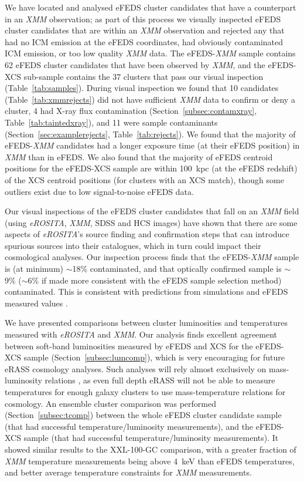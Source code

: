 \documentclass[fleqn,usenatbib]{mnras}
\begin{document}
We have located and analysed eFEDS cluster candidates that have a counterpart in an {\em XMM} observation; as part of this process we visually inspected eFEDS cluster candidates that are within an {\em XMM} observation and rejected any that had no ICM emission at the eFEDS coordinates, had obviously contaminated ICM emission, or too low quality {\em XMM} data. The eFEDS-{\em XMM} sample contains 62 eFEDS cluster candidates that have been observed by {\em XMM}, and the eFEDS-XCS sub-sample contains the 37 clusters that pass our visual inspection (Table~\ref{tab:samples}). During visual inspection we found that 10 candidates (Table~\ref{tab:xmmrejects}) did not have sufficient {\em XMM} data to confirm or deny a cluster, 4 had X-ray flux contamination (Section~\ref{subsec:contamxray}, Table~\ref{tab:taintedxray}), and 11 were sample contaminants (Section~\ref{sec:examplerejects}, Table~\ref{tab:rejects}). We found that the majority of eFEDS-{\em XMM} candidates had a longer exposure time (at their eFEDS position) in {\em XMM} than in eFEDS. We also found that the majority of eFEDS centroid positions for the eFEDS-XCS sample are within 100~kpc (at the eFEDS redshift) of the XCS centroid positions (for clusters with an XCS match), though some outliers exist due to low signal-to-noise eFEDS data.

Our visual inspections of the eFEDS cluster candidates that fall on an {\em XMM} field (using {\em eROSITA}, {\em XMM}, SDSS and HCS images) have shown that there are some aspects of {\em eROSITA}'s source finding and confirmation steps that can introduce spurious sources into their catalogues, which in turn could impact their cosmological analyses. Our inspection process finds that the eFEDS-{\em XMM} sample is (at minimum) ${\sim}$18\% contaminated, and that optically confirmed sample is ${\sim}$9\% (${\sim}$6\% if made more consistent with the eFEDS sample selection method) contaminated. This is consistent with predictions from simulations \citep[][]{simerass} and eFEDS measured values \citep[][]{efedsclusteropticalcat}.

We have presented comparisons between cluster luminosities and temperatures measured with {\em eROSITA} and {\em XMM}. Our analysis finds excellent agreement between soft-band luminosities measured by eFEDS and XCS for the eFEDS-XCS sample (Section~\ref{subsec:lumcomp}), which is very encouraging for future eRASS cosmology analyses. Such analyses will rely almost exclusively on mass-luminosity relations \citep[such as the recent eFEDS-HSC work, ][]{efedsmor}, as even full depth eRASS will not be able to measure temperatures for enough galaxy clusters to use mass-temperature relations for cosmology. 
An ensemble cluster comparison was performed (Section~\ref{subsec:tcomp}) between the whole eFEDS cluster candidate sample (that had successful temperature/luminosity measurements), and the eFEDS-XCS sample (that had successful temperature/luminosity measurements). It showed similar results to the XXL-100-GC comparison, with a greater fraction of {\em XMM} temperature measurements being above 4~keV than eFEDS temperatures, and better average temperature constraints for {\em XMM} measurements.
\end{document}

